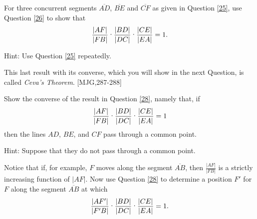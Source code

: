 \documentclass{ximera}
\begin{document}
\begin{question}
\label{28}  For three concurrent segments $\overline{AD}$,
$\overline{BE}$ and $\overline{CF}$ as given in Question \ref{25}, use
Question \ref{26} to show that%
\[
\frac{\left\vert AF\right\vert }{\left\vert FB\right\vert }%
\text{\textperiodcentered}\frac{\left\vert BD\right\vert }{\left\vert
DC\right\vert }\text{\textperiodcentered}\frac{\left\vert CE\right\vert
}{\left\vert EA\right\vert }=1.
\]


Hint: Use Question \ref{25} repeatedly. 
\end{question}

This last result with its converse, which you will show in the next Question,
is called \textit{Ceva's Theorem}. [MJG,287-288]

\begin{question}
Show the converse of the result in Question \ref{28}, namely
that, if%
\[
\frac{\left\vert AF\right\vert }{\left\vert FB\right\vert }%
\text{\textperiodcentered}\frac{\left\vert BD\right\vert }{\left\vert
DC\right\vert }\text{\textperiodcentered}\frac{\left\vert CE\right\vert
}{\left\vert EA\right\vert }=1
\]
then the lines $AD$, $BE$, and $CF$ pass through a common point.

Hint: Suppose that they do not pass through a common point.
\begin{image}
\end{image}
Notice that if, for example, $F$ moves along the segment
$\overline{AB}$, then $\frac{\left\vert AF\right\vert }{\left\vert
FB\right\vert }$ is a strictly increasing function of $\left\vert
AF\right\vert $. Now use Question \ref{28} to determine a position
$F'$ for $F$ along the segment $\overline{AB}$ at which
\[
\frac{\left\vert AF'\right\vert }{\left\vert F'B\right\vert
}\text{\textperiodcentered}\frac{\left\vert BD\right\vert }{\left\vert
DC\right\vert }\text{\textperiodcentered}\frac{\left\vert CE\right\vert
}{\left\vert EA\right\vert }=1.
\]
\end{question}
\end{document}
